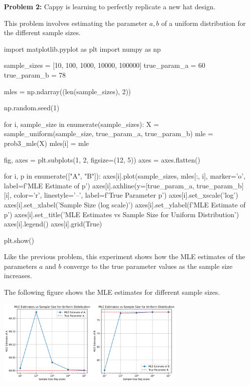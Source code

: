 \documentclass[a4paper, 10pt]{article}
\begin{document}
\newpage

\begin{subproblems}[start=2]
    \item \textbf{Problem 2: } Cappy is learning to perfectly replicate a new hat design.
\end{subproblems}

\begin{solution}
This problem involves estimating the parameter \( a, b \) of a uniform distribution for the different sample sizes.
\begin{codingbox}
import matplotlib.pyplot as plt
import numpy as np

sample_sizes = [10, 100, 1000, 10000, 100000]
true_param_a = 60
true_param_b = 78

mles = np.ndarray((len(sample_sizes), 2))

np.random.seed(1)

for i, sample_size in enumerate(sample_sizes):
    X = sample_uniform(sample_size, true_param_a, true_param_b)
    mle = prob3_mle(X)
    mles[i] = mle

fig, axes = plt.subplots(1, 2, figsize=(12, 5))
axes = axes.flatten()

for i, p in enumerate(["A", "B"]):
    axes[i].plot(sample_sizes, mles[:, i], marker='o', label=f'MLE Estimate of {p}')
    axes[i].axhline(y=[true_param_a, true_param_b][i], color='r', linestyle='--', label=f'True Parameter {p}')
    axes[i].set_xscale('log')
    axes[i].set_xlabel('Sample Size (log scale)')
    axes[i].set_ylabel(f'MLE Estimate of {p}')
    axes[i].set_title('MLE Estimates vs Sample Size for Uniform Distribution')
    axes[i].legend()
    axes[i].grid(True)

plt.show()
\end{codingbox}

Like the previous problem, this experiment shows how the MLE estimates of the parameters \( a \) and \( b \) converge to the true parameter values as the sample size increases.

\vspace{3mm}

The following figure shows the MLE estimates for different sample sizes.
\begin{center}
    \includegraphics[width=0.7\textwidth]{images/problem_7_2.png}
\end{center}
\end{solution}
\end{document}

